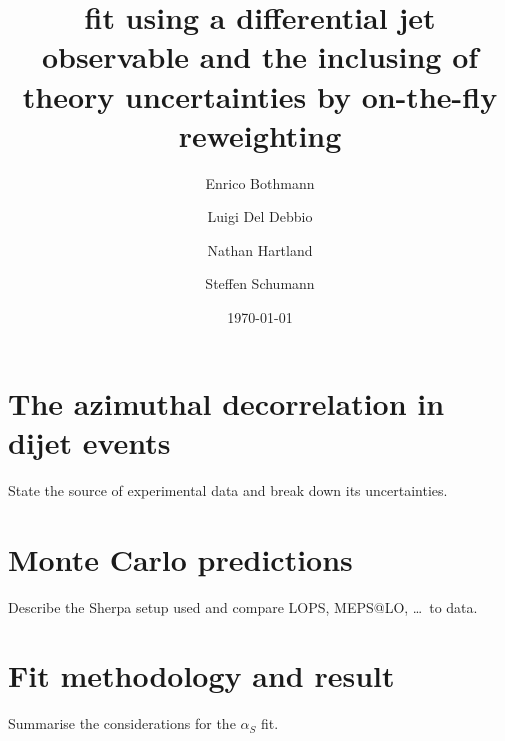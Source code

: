 \documentclass[a4paper]{scrartcl}
\title{\alphas fit using a differential jet observable and the inclusing of
theory uncertainties by on-the-fly reweighting}
\author{Enrico Bothmann \and Luigi Del Debbio \and Nathan Hartland \and Steffen
Schumann}
\date{\today}
\newcommand{\alphas}{\ensuremath{\alpha_S}\xspace}
\begin{document}
\maketitle
\section{The azimuthal decorrelation in dijet events}
State the source of experimental data and break down its uncertainties.
\cite{Khachatryan:2011zj,Khachatryan:2016hkr}
\section{Monte Carlo predictions}
Describe the Sherpa setup used and compare LOPS, MEPS@LO, \dots\ to data.
\section{Fit methodology and result}
Summarise the considerations for the \alphas fit.



\end{document}
